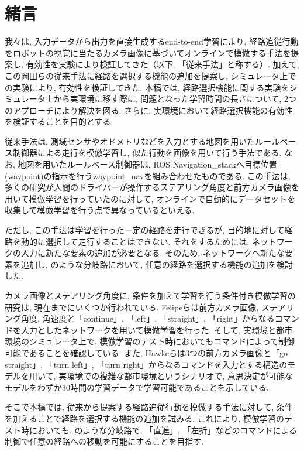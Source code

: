 \documentclass{jarticle}
\begin{document}
\date{} %

\maketitle
\thispagestyle{empty}
\pagestyle{empty}

\small
\section{緒言}%
我々は, 入力データから出力を直接生成するend-to-end学習により, 経路追従行動をロボットの視覚に当たるカメラ画像に基づいてオンラインで模倣する手法を提案し, 有効性を実験により検証してきた\cite{okada1}\cite{okada2}（以下, 「従来手法」と称する）. 加えて, この岡田らの従来手法に経路を選択する機能の追加を提案し, シミュレータ上での実験により, 有効性を検証してきた\cite{mech}. 本稿では, 経路選択機能に関する実験をシミュレータ上から実環境に移す際に, 問題となった学習時間の長さについて, 2つのアプローチにより解決を図る. さらに, 実環境において経路選択機能の有効性を検証することを目的とする.
\par
従来手法は, 測域センサやオドメトリなどを入力とする地図を用いたルールベース制御器による走行を模倣学習し, 似た行動を画像を用いて行う手法である. なお, 地図を用いたルールベース制御器は, ROS Navigation\_stack\cite{nav}へ目標位置(waypoint)の指示を行うwaypoint\_nav\cite{waypoint}を組み合わせたものである. この手法は, 多くの研究\cite{bojarski}\cite{moridian}\cite{hawke}が人間のドライバーが操作するステアリング角度と前方カメラ画像を用いて模倣学習を行っていたのに対して, オンラインで自動的にデータセットを収集して模倣学習を行う点で異なっているといえる.
\par
ただし, この手法は学習を行った一定の経路を走行できるが, 目的地に対して経路を動的に選択して走行することはできない. それをするためには, ネットワークの入力に新たな要素の追加が必要となる. そのため, ネットワークへ新たな要素を追加し, のような分岐路において, 任意の経路を選択する機能の追加を検討した.
\par
カメラ画像とステアリング角度に, 条件を加えて学習を行う条件付き模倣学習の研究は, 現在までにいくつか行われている. Felipeら\cite{felipe}は前方カメラ画像, ステアリング角度, 角速度と「continue」, 「left」, 「straight」, 「right」からなるコマンドを入力としたネットワークを用いて模倣学習を行った. そして, 実環境と都市環境のシミュレータ上で, 模倣学習のテスト時においてもコマンドによって制御可能であることを確認している. また, Hawkeら\cite{hawke}は3つの前方カメラ画像と「go straight」, 「turn left」, 「turn right」からなるコマンドを入力とする構造のモデルを用いて, 実環境での複雑な都市環境というシナリオで, 意思決定が可能なモデルをわずか30時間の学習データで学習可能であることを示している.
\par
そこで本稿では, 従来から提案する経路追従行動を模倣する手法に対して, 条件を加えることで経路を選択する機能の追加を試みる. これにより, 模倣学習のテスト時においても, のような分岐路で, 
「直進」, 「左折」などのコマンドによる制御で任意の経路への移動を可能にすることを目指す.
\end{document}

